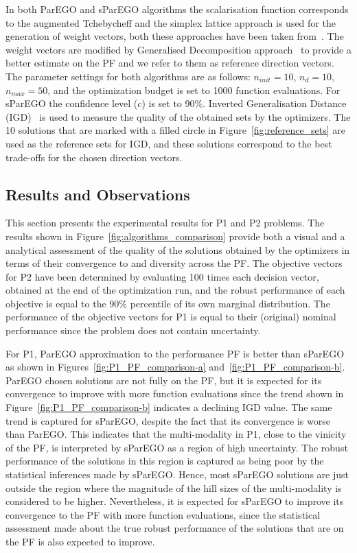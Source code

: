 \documentclass{llncs}
\begin{document}
In both ParEGO and sParEGO algorithms the scalarisation function corresponds to the augmented Tchebycheff and the simplex lattice approach is used for the generation of weight vectors, both these approaches have been taken from~\cite{Knowles2006ParEGO}. The weight vectors are modified by Generalised Decomposition approach~\cite{giagkiozis2014generalized} to provide a better estimate on the PF and we refer to them as reference direction vectors. The parameter settings for both algorithms are as follows: $n_{init} = 10$, $n_d = 10$, $n_{max} = 50$, and the optimization budget is set to 1000 function evaluations. For sParEGO the confidence level ($c$) is set to 90\%. Inverted Generalisation Distance (IGD)~\cite{bib:generational_distance} is used to measure the quality of the obtained sets by the optimizers. The 10 solutions that are marked with a filled circle in Figure~\ref{fig:reference_sets} are used as the reference sets for IGD, and these solutions correspond to the best trade-offs for the chosen direction vectors.


\subsection{Results and Observations}

This section presents the experimental results for P1 and P2 problems. The results shown in Figure~\ref{fig:algorithms_comparison} provide both a visual and a analytical assessment of the quality of the solutions obtained by the optimizers in terms of their convergence to and diversity across the PF. The objective vectors for P2 have been determined by evaluating 100 times each decision vector, obtained at the end of the optimization run, and the robust performance of each objective is equal to the 90\% percentile of its own marginal distribution. The performance of the objective vectors for P1 is equal to their (original) nominal performance since the problem does not contain uncertainty.

For P1, ParEGO approximation to the performance PF is better than sParEGO as shown in Figures~\ref{fig:P1_PF_comparison-a} and~\ref{fig:P1_PF_comparison-b}. ParEGO chosen solutions are not fully on the PF, but it is expected for its convergence to improve with more function evaluations since the trend shown in Figure~\ref{fig:P1_PF_comparison-b} indicates a declining IGD value. The same trend is captured for sParEGO, despite the fact that its convergence is worse than ParEGO. This indicates that the multi-modality in P1, close to the vinicity of the PF, is interpreted by sParEGO as a region of high uncertainty. The robust performance of the solutions in this region is captured as being poor by the statistical inferences made by sParEGO. Hence, most sParEGO solutions are just outside the region where the magnitude of the hill sizes of the multi-modality is considered to be higher. Nevertheless, it is expected for sParEGO to improve its convergence to the PF with more function evaluations, since the statistical assessment made about the true robust performance of the solutions that are on the PF is also expected to improve.
\end{document}
